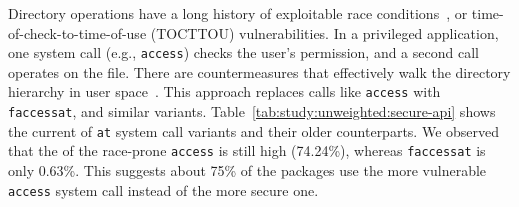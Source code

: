Directory operations have a long history of exploitable race conditions~\citep{tocttou-truck, wei05fast, races-usenix05}, or time-of-check-to-time-of-use (TOCTTOU) vulnerabilities.
In a privileged application, one system call (e.g., {\tt access}) checks 
the user's permission, and a second call operates on the file.
There are countermeasures that effectively walk the directory
hierarchy in user space~\citep{tsafrir08tr}.
This approach replaces calls like {\tt access} with {\tt faccessat},
and similar variants.
Table~\ref{tab:study:unweighted:secure-api} shows the current \unwusagemetric{} of
{\tt *at} system call variants and their older counterparts.
We observed that the \unwusagemetric{} of
the race-prone {\tt access} is still high (74.24\%), whereas {\tt faccessat} is only 0.63\%.
This suggests about 75\% of the
packages use the more vulnerable {\tt access} system call instead of the more secure one.

